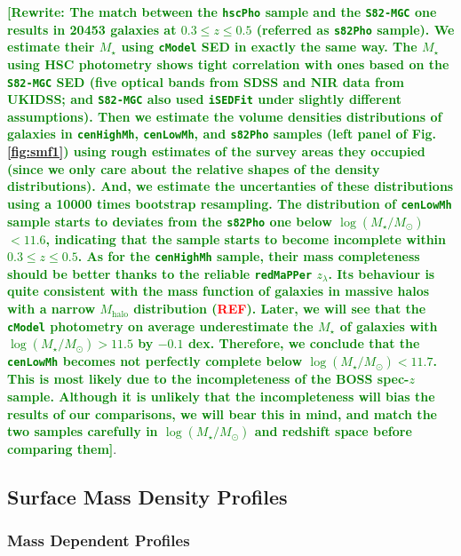 \documentclass{emulateapj}
\def\redm{\texttt{redMaPPer}}
\def\cmodel{\texttt{cModel}}
\def\rbcg{\texttt{cenHighMh}}
\def\nbcg{\texttt{cenLowMh}}
\def\mstar{{$M_{\star}$}}
\def\mhalo{{$M_{\mathrm{halo}}$}}
\def\logms{{$\log (M_{\star}/M_{\odot})$}}
\newcommand{\addref}{{\textcolor{red}{REF}}}
\newcommand{\rewrite}[1]{\textcolor{green}{\textbf{[Rewrite: #1]}}}
\begin{document}
\begin{CJK*}{UTF8}{gbsn}
    \rewrite{The match between the \texttt{hscPho} sample and the \texttt{S82-MGC} one results in 
    20453 galaxies at $0.3 \leq z \leq 0.5$ (referred as \texttt{s82Pho} sample).  
    We estimate their \mstar{} using \texttt{cModel} SED in exactly the same way. 
    The \mstar{} using HSC photometry shows tight correlation with ones based on the
    \texttt{S82-MGC} SED (five optical bands from SDSS and NIR data from UKIDSS; and 
    \texttt{S82-MGC} also used \texttt{iSEDFit} under slightly different assumptions).  
    Then we estimate the volume densities distributions of galaxies in \rbcg{}, \nbcg{}, 
    and \texttt{s82Pho} samples (left panel of Fig.\ref{fig:smf1}) using rough estimates 
    of the survey areas they occupied (since we only care about the relative shapes of 
    the density distributions). 
    And, we estimate the uncertanties of these distributions using a 10000 times 
    bootstrap resampling. 
    The distribution of \nbcg{} sample starts to deviates from the \texttt{s82Pho} one 
    below \logms{}$< 11.6$, indicating that the sample starts to become incomplete within
    $0.3 \leq z \leq 0.5$. 
    As for the \rbcg{} sample, their mass completeness should be better thanks to the 
    reliable \redm{} $z_{\lambda}$. 
    Its behaviour is quite consistent with the mass function of galaxies in massive 
    halos with a narrow \mhalo{} distribution (\addref).   
    Later, we will see that the \cmodel{} photometry on average underestimate the 
    \mstar{} of galaxies with \logms{}$>11.5$ by $-0.1$ dex.
    Therefore, we conclude that the \nbcg{} becomes not perfectly complete below 
    \logms{}$< 11.7$.  
    This is most likely due to the incompleteness of the BOSS spec-$z$ sample. 
    Although it is unlikely that the incompleteness will bias the results of our 
    comparisons, we will bear this in mind, and match the two samples carefully in 
    \logms{} and redshift space before comparing them}.
    
    
    
    
    
\subsection{Surface Mass Density Profiles}
    \label{ssec:sbp_compare}

\subsubsection{Mass Dependent Profiles}
    \label{sssec:sbp_inter}
        

\end{CJK*}
\end{document}
